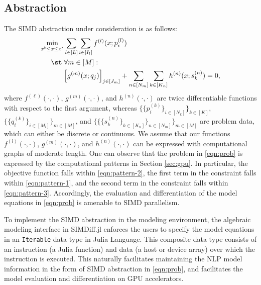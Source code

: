 \subsection{Abstraction}
The SIMD abstraction under consideration is as follows:
\begin{align}\label{eqn:prob}
  \min_{x^\flat\leq x \leq x^\sharp}
  & \sum_{l\in[L]}\sum_{i\in [I_l]} f^{(l)}(x; p^{(l)}_i)\\\nonumber
  \st\; &\forall m\in[M]:\\\nonumber
  &\begin{aligned}[t]
    \left[g^{(m)}(x; q_j)\right]_{j\in [J_m]} +\sum_{n\in [N_m]}\sum_{k\in [K_n]}h^{(n)}(x; s^{(n)}_{k}) =0,
  \end{aligned}
  \end{align}
where $f^{(\ell)}(\cdot,\cdot)$, $g^{(m)}(\cdot,\cdot)$, and
$h^{(n)}(\cdot,\cdot)$ are twice differentiable functions with respect
to the first argument, whereas $\{\{p^{(k)}_i\}_{i\in [N_k]}\}_{k\in[K]}$,
$\{\{q^{(k)}_{i}\}_{i\in [M_l]}\}_{m\in[M]}$, and
$\{\{\{s^{(n)}_{k}\}_{k\in[K_n]}\}_{n\in[N_m]}\}_{m\in[M]}$ are
problem data, which can either be discrete or continuous.  We assume
that our functions $f^{(l)}(\cdot,\cdot)$, $g^{(m)}(\cdot,\cdot)$, and
$h^{(n)}(\cdot,\cdot)$ can be expressed with computational
graphs of moderate length. One can observe that the problem in
\eqref{eqn:prob} is expressed by the computational patterns in Section
\ref{sec:gpu}. In particular, the objective function falls within \ref{eqn:pattern-2},
the first term in the constraint falls within \ref{eqn:pattern-1}, and the second term in the constraint falls within \ref{eqn:pattern-3}.
Accordingly, the evaluation and differentiation of the
model equations in \eqref{eqn:prob} is amenable to SIMD parallelism.

To implement the SIMD abstraction in the modeling environment, the
algebraic modeling interface in SIMDiff.jl enforces the users to
specify the model equations in an {\tt Iterable} data type in
Julia Language. This composite data type consists of an instruction (a Julia
function) and data (a host or device array) over which the instruction
is executed. This naturally facilitates maintaining the NLP model
information in the form of SIMD abstraction in \eqref{eqn:prob}, and
facilitates the model evaluation and differentiation on GPU
accelerators.

